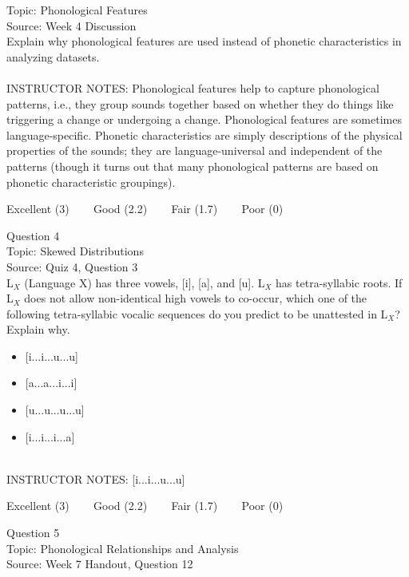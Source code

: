 \documentclass[12pt]{article}
\begin{document}
Topic: Phonological Features\\
Source: Week 4 Discussion\\

Explain why phonological features are used instead of phonetic characteristics in analyzing datasets.\\


~\\
INSTRUCTOR NOTES: Phonological features help to capture phonological patterns, i.e., they group sounds together based on whether they do things like triggering a change or undergoing a change. Phonological features are sometimes language-specific. Phonetic characteristics are simply descriptions of the physical properties of the sounds; they are language-universal and independent of the patterns (though it turns out that many phonological patterns are based on phonetic characteristic groupings).


\vfill
Excellent (3) ~~~ Good (2.2) ~~~ Fair (1.7) ~~~ Poor (0)
\newpage

{\large Question 4}\\

Topic: Skewed Distributions\\
Source: Quiz 4, Question 3\\

L$_X$ (Language X) has three vowels, [i], [a], and [u]. L$_X$ has tetra-syllabic roots. If L$_X$ does not allow non-identical high vowels to co-occur, which one of the following tetra-syllabic vocalic sequences do you predict to be unattested in L$_X$? Explain why.\\

\begin{itemize} \item {[i...i...u...u]} \item {[a...a...i...i]} \item {[u...u...u...u]} \item {[i...i...i...a]} \end{itemize}


~\\
INSTRUCTOR NOTES: [i...i...u...u]


\vfill
Excellent (3) ~~~ Good (2.2) ~~~ Fair (1.7) ~~~ Poor (0)
\newpage

{\large Question 5}\\

Topic: Phonological Relationships and Analysis\\
Source: Week 7 Handout, Question 12\\
\end{document}
